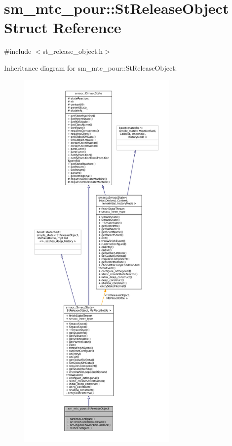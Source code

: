 \hypertarget{structsm__mtc__pour_1_1StReleaseObject}{}\section{sm\+\_\+mtc\+\_\+pour\+:\+:St\+Release\+Object Struct Reference}
\label{structsm__mtc__pour_1_1StReleaseObject}


{\ttfamily \#include $<$st\+\_\+release\+\_\+object.\+h$>$}



Inheritance diagram for sm\+\_\+mtc\+\_\+pour\+:\+:St\+Release\+Object\+:
\nopagebreak
\begin{figure}[H]
\begin{center}
\leavevmode
\includegraphics[height=550pt]{structsm__mtc__pour_1_1StReleaseObject__inherit__graph}
\end{center}
\end{figure}


